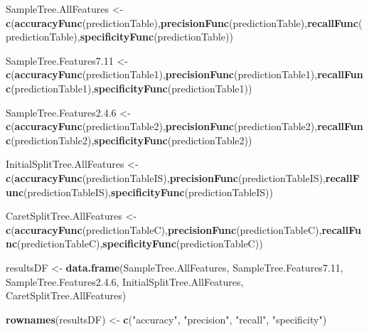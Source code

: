 \documentclass[
]{article}
\newenvironment{Shaded}{\begin{snugshade}}{\end{snugshade}}
\newcommand{\FloatTok}[1]{\textcolor[rgb]{0.00,0.00,0.81}{#1}}
\newcommand{\FunctionTok}[1]{\textcolor[rgb]{0.13,0.29,0.53}{\textbf{#1}}}
\newcommand{\NormalTok}[1]{#1}
\newcommand{\OtherTok}[1]{\textcolor[rgb]{0.56,0.35,0.01}{#1}}
\newcommand{\StringTok}[1]{\textcolor[rgb]{0.31,0.60,0.02}{#1}}
\begin{document}
\begin{Shaded}
\begin{Highlighting}[]
\NormalTok{SampleTree.AllFeatures }\OtherTok{\textless{}{-}} \FunctionTok{c}\NormalTok{(}\FunctionTok{accuracyFunc}\NormalTok{(predictionTable),}\FunctionTok{precisionFunc}\NormalTok{(predictionTable),}\FunctionTok{recallFunc}\NormalTok{(predictionTable),}\FunctionTok{specificityFunc}\NormalTok{(predictionTable))}

\NormalTok{SampleTree.Features7}\FloatTok{.11} \OtherTok{\textless{}{-}} \FunctionTok{c}\NormalTok{(}\FunctionTok{accuracyFunc}\NormalTok{(predictionTable1),}\FunctionTok{precisionFunc}\NormalTok{(predictionTable1),}\FunctionTok{recallFunc}\NormalTok{(predictionTable1),}\FunctionTok{specificityFunc}\NormalTok{(predictionTable1))}

\NormalTok{SampleTree.Features2.}\FloatTok{4.6} \OtherTok{\textless{}{-}} \FunctionTok{c}\NormalTok{(}\FunctionTok{accuracyFunc}\NormalTok{(predictionTable2),}\FunctionTok{precisionFunc}\NormalTok{(predictionTable2),}\FunctionTok{recallFunc}\NormalTok{(predictionTable2),}\FunctionTok{specificityFunc}\NormalTok{(predictionTable2))}

\NormalTok{InitialSplitTree.AllFeatures }\OtherTok{\textless{}{-}} \FunctionTok{c}\NormalTok{(}\FunctionTok{accuracyFunc}\NormalTok{(predictionTableIS),}\FunctionTok{precisionFunc}\NormalTok{(predictionTableIS),}\FunctionTok{recallFunc}\NormalTok{(predictionTableIS),}\FunctionTok{specificityFunc}\NormalTok{(predictionTableIS))}

\NormalTok{CaretSplitTree.AllFeatures }\OtherTok{\textless{}{-}} \FunctionTok{c}\NormalTok{(}\FunctionTok{accuracyFunc}\NormalTok{(predictionTableC),}\FunctionTok{precisionFunc}\NormalTok{(predictionTableC),}\FunctionTok{recallFunc}\NormalTok{(predictionTableC),}\FunctionTok{specificityFunc}\NormalTok{(predictionTableC))}

\NormalTok{resultsDF }\OtherTok{\textless{}{-}} \FunctionTok{data.frame}\NormalTok{(SampleTree.AllFeatures, SampleTree.Features7}\FloatTok{.11}\NormalTok{, SampleTree.Features2.}\FloatTok{4.6}\NormalTok{, InitialSplitTree.AllFeatures, CaretSplitTree.AllFeatures)}

\FunctionTok{rownames}\NormalTok{(resultsDF) }\OtherTok{\textless{}{-}} \FunctionTok{c}\NormalTok{(}\StringTok{"accuracy"}\NormalTok{, }\StringTok{"precision"}\NormalTok{, }\StringTok{"recall"}\NormalTok{, }\StringTok{"specificity"}\NormalTok{)}
\end{Highlighting}
\end{Shaded}
\end{document}
